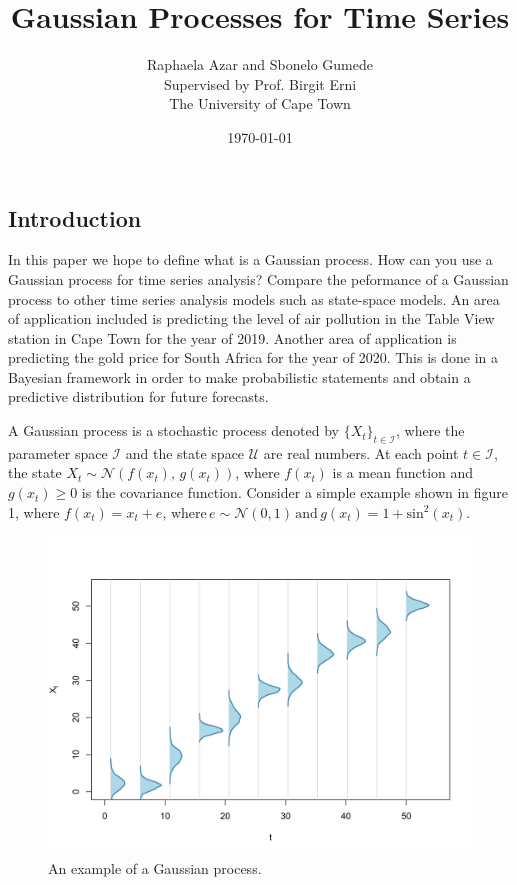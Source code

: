 \documentclass[a4paper, 10pt]{article}
\title{Gaussian Processes for Time Series}
\date{\today}
\author{Raphaela Azar and Sbonelo Gumede \\
Supervised by Prof. Birgit Erni\\
The University of Cape Town}
\begin{document}
   \maketitle

   \begin{flushleft}
   
   \section*{Introduction}

   In this paper we hope to define what is a Gaussian process. How can you use a Gaussian process for time series analysis? Compare the peformance of a Gaussian process to other time series analysis models such as state-space models. An area of application included is predicting the level of air pollution in the Table View station in Cape Town for the year of 2019. Another area of application is predicting the gold price for South Africa for the year of 2020. This is done in a Bayesian framework in order to make probabilistic statements and obtain a predictive distribution for future forecasts.

   \vspace{1em}

   A Gaussian process is a stochastic process denoted by $\{X_{t} \}_{t \in \mathcal{I}}$, where the parameter space $\mathcal{I}$ and the state space $\mathcal{U}$ are real numbers. 
   At each point $t \in \mathcal{I}$, the state $X_{t} \sim \mathcal{N}(f(x_{t}), \, g(x_{t}))$, where $f(x_{t})$ is a mean function and $g(x_{t}) \geq 0$ is the covariance function.  
   Consider a simple example shown in figure 1, where $f(x_{t}) = x_{t} + e, \, \text{where} \, e \sim \mathcal{N}(0, 1) \, \text{and} \, g(x_{t}) = 1 + \text{sin}^{2}(x_{t})$.
   
   \begin{figure}[H]
            \raggedright
            \includegraphics[width=0.48\linewidth]{../images/gp.png}
            \caption{An example of a Gaussian process.}
   \end{figure}
   

\end{flushleft}
\end{document}
